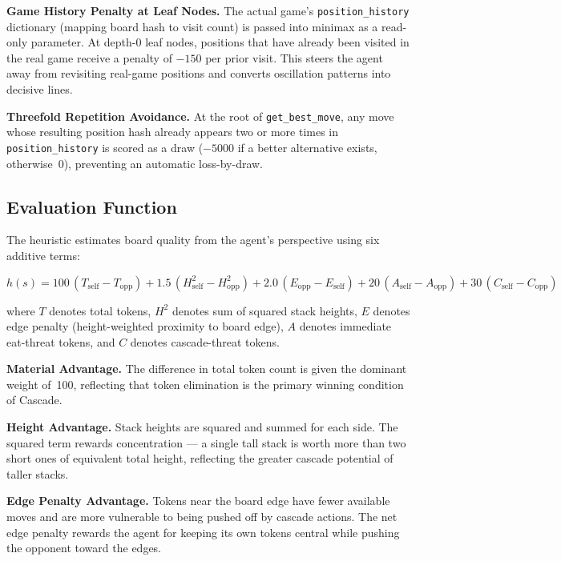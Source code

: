 \documentclass[10pt,a4paper]{article}
\begin{document}
\textbf{Game History Penalty at Leaf Nodes.}
The actual game's \texttt{position\_history} dictionary (mapping board hash to visit count) is passed into minimax as a read-only parameter. At depth-0 leaf nodes, positions that have already been visited in the real game receive a penalty of $-150$ per prior visit. This steers the agent away from revisiting real-game positions and converts oscillation patterns into decisive lines.

\textbf{Threefold Repetition Avoidance.}
At the root of \texttt{get\_best\_move}, any move whose resulting position hash already appears two or more times in \texttt{position\_history} is scored as a draw ($-5000$ if a better alternative exists, otherwise~0), preventing an automatic loss-by-draw.

\subsection{Evaluation Function}

The heuristic estimates board quality from the agent's perspective using six additive terms:

\begin{equation}
h(s) = 100\,(T_{\text{self}} - T_{\text{opp}})
      + 1.5\,(H^{2}_{\text{self}} - H^{2}_{\text{opp}})
      + 2.0\,(E_{\text{opp}} - E_{\text{self}})
      + 20\,(A_{\text{self}} - A_{\text{opp}})
      + 30\,(C_{\text{self}} - C_{\text{opp}})
\end{equation}

where $T$ denotes total tokens, $H^{2}$ denotes sum of squared stack heights, $E$ denotes edge penalty (height-weighted proximity to board edge), $A$ denotes immediate eat-threat tokens, and $C$ denotes cascade-threat tokens.

\textbf{Material Advantage.}
The difference in total token count is given the dominant weight of~100, reflecting that token elimination is the primary winning condition of Cascade.

\textbf{Height Advantage.}
Stack heights are squared and summed for each side. The squared term rewards concentration --- a single tall stack is worth more than two short ones of equivalent total height, reflecting the greater cascade potential of taller stacks.

\textbf{Edge Penalty Advantage.}
Tokens near the board edge have fewer available moves and are more vulnerable to being pushed off by cascade actions. The net edge penalty rewards the agent for keeping its own tokens central while pushing the opponent toward the edges.
\end{document}
